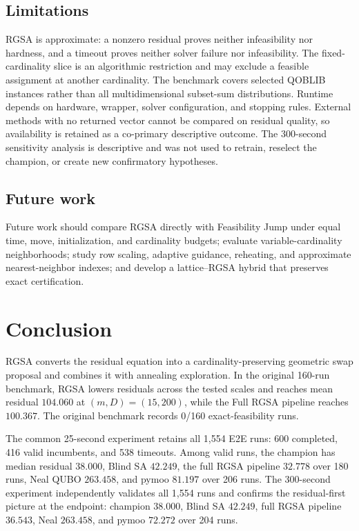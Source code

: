 \documentclass[11pt]{article}
\begin{document}
\subsection{Limitations}
RGSA is approximate: a nonzero residual proves neither infeasibility nor hardness, and a timeout proves neither solver failure nor infeasibility. The fixed-cardinality slice is an algorithmic restriction and may exclude a feasible assignment at another cardinality. The benchmark covers selected QOBLIB instances rather than all multidimensional subset-sum distributions. Runtime depends on hardware, wrapper, solver configuration, and stopping rules. External methods with no returned vector cannot be compared on residual quality, so availability is retained as a co-primary descriptive outcome. The 300-second sensitivity analysis is descriptive and was not used to retrain, reselect the champion, or create new confirmatory hypotheses.

\subsection{Future work}
Future work should compare RGSA directly with Feasibility Jump under equal time, move, initialization, and cardinality budgets; evaluate variable-cardinality neighborhoods; study row scaling, adaptive guidance, reheating, and approximate nearest-neighbor indexes; and develop a lattice--RGSA hybrid that preserves exact certification.

\section{Conclusion}\label{sec:conclusion}
RGSA converts the residual equation into a cardinality-preserving geometric swap proposal and combines it with annealing exploration. In the original 160-run benchmark, RGSA lowers residuals across the tested scales and reaches mean residual $104.060$ at $(m,D)=(15,200)$, while the Full RGSA pipeline reaches $100.367$. The original benchmark records 0/160 exact-feasibility runs.

The common 25-second experiment retains all 1,554 E2E runs: 600 completed, 416 valid incumbents, and 538 timeouts. Among valid runs, the champion has median residual $38.000$, Blind SA $42.249$, the full RGSA pipeline $32.778$ over 180 runs, Neal QUBO $263.458$, and pymoo $81.197$ over 206 runs. The 300-second experiment independently validates all 1,554 runs and confirms the residual-first picture at the endpoint: champion $38.000$, Blind SA $42.249$, full RGSA pipeline $36.543$, Neal $263.458$, and pymoo $72.272$ over 204 runs.
\end{document}
